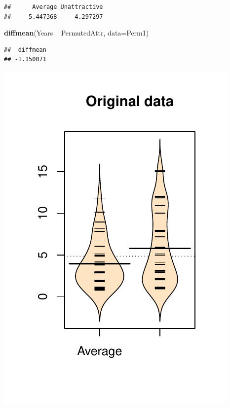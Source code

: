 \documentclass[]{book}
\newenvironment{Shaded}{\begin{snugshade}}{\end{snugshade}}
\newcommand{\KeywordTok}[1]{\textcolor[rgb]{0.13,0.29,0.53}{\textbf{{#1}}}}
\newcommand{\DataTypeTok}[1]{\textcolor[rgb]{0.13,0.29,0.53}{{#1}}}
\newcommand{\StringTok}[1]{\textcolor[rgb]{0.31,0.60,0.02}{{#1}}}
\newcommand{\NormalTok}[1]{{#1}}
\begin{document}
\begin{verbatim}
##      Average Unattractive 
##     5.447368     4.297297
\end{verbatim}

\begin{Shaded}
\begin{Highlighting}[]
\KeywordTok{diffmean}\NormalTok{(Years ~}\StringTok{ }\NormalTok{PermutedAttr, }\DataTypeTok{data=}\NormalTok{Perm1)}
\end{Highlighting}
\end{Shaded}

\begin{verbatim}
##  diffmean 
## -1.150071
\end{verbatim}




\includegraphics{GreenwoodBanner_files/figure-latex/Figure2-8-1.pdf}
\end{document}
